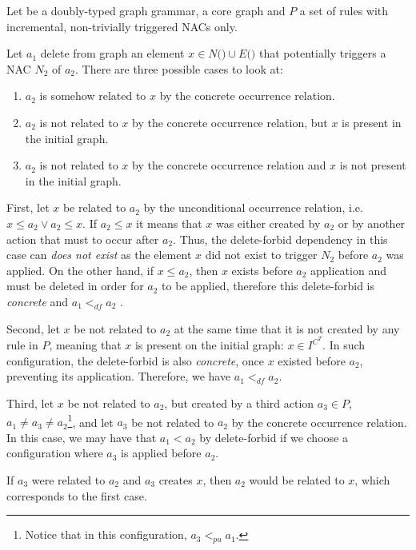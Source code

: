 \begin{definition} Let \doublyTypedGraphGrammarCore{} be a doubly-typed graph grammar, \coreGraph{} a core graph and $P$ a set of rules with incremental, non-trivially triggered NACs only.


\hfill

Let $a_1$ delete from graph \coreGraph{} an element $x \in N($\coreGraph$) \cup E($\coreGraph$)$ that potentially triggers a NAC $N_2$ of $a_2$. There are three possible cases to look at:

\begin{enumerate}
  \item $a_2$ is somehow related to $x$ by the concrete occurrence relation.
  \item $a_2$ is not related to $x$ by the concrete occurrence relation, but $x$ is present in the initial graph.
  \item $a_2$ is not related to $x$ by the concrete occurrence relation and $x$ is not present in the initial graph.
\end{enumerate}

  First, let $x$ be related to $a_2$ by the unconditional occurrence relation, i.e. \mbox{$x \leq a_2 \lor a_2 \leq x$}. If $a_2 \leq x$ it means that $x$ was either created by $a_2$ or by another action that must to occur after $a_2$. Thus, the delete-forbid dependency in this case can \emph{does not exist} as the element $x$ did not exist to trigger $N_2$ before $a_2$ was applied. On the other hand, if $x \leq a_2$, then $x$ exists before $a_2$
  application and must be deleted in order for $a_2$ to be applied, therefore this delete-forbid is \emph{concrete} and $a_1 <_{df} a_2$ .

  Second, let $x$ be not related to $a_2$ at the same time that it is not created by any rule in $P$, meaning that $x$ is present on the initial graph: $x \in I^{C^T}$. In such configuration, the delete-forbid is also \emph{concrete}, once $x$ existed before $a_2$, preventing its application. Therefore, we have $a_1 <_{df} a_2$.

  Third, let $x$ be not related to $a_2$, but created by a third action $a_3 \in P$, $a_1 \ne a_3 \ne a_2$\footnote{Notice that in this configuration, $a_3 <_{pu} a_1$.}, and let $a_3$ be not related to $a_2$ by the concrete occurrence relation. In this case, we may have that $a_1 < a_2$ by delete-forbid if we choose a configuration where $a_3$ is applied before $a_2$.
  
  If $a_3$ were related to $a_2$ and $a_3$ creates $x$, then $a_2$ would be related to $x$, which corresponds to the first case.


\end{definition}

